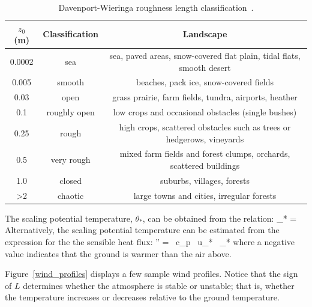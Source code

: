 \documentclass[11pt]{book}
\begin{document}
\begin{table}[!ht]
\centering
\caption[Davenport-Wieringa roughness length classification]{Davenport-Wieringa roughness length classification~\cite{Stull:2000}.}
\begin{tabular}{|c|c|c|} \hline
$z_0$ (m)    & Classification    & Landscape  \\  \hline \hline
0.0002       & sea               & sea, paved areas, snow-covered flat plain, tidal flats, smooth desert \\ \hline
0.005        & smooth            & beaches, pack ice, snow-covered fields                                \\ \hline
0.03         & open              & grass prairie, farm fields, tundra, airports, heather                 \\ \hline
0.1          & roughly open      & low crops and occasional obstacles (single bushes)                    \\ \hline
0.25         & rough             & high crops, scattered obstacles such as trees or hedgerows, vineyards \\ \hline
0.5          & very rough        & mixed farm fields and forest clumps, orchards, scattered buildings    \\ \hline
1.0          & closed            & suburbs, villages, forests                                            \\ \hline
>2           & chaotic           & large towns and cities, irregular forests                             \\ \hline
\end{tabular}
\label{z0}
\end{table}

The scaling potential temperature, $\theta_*$, can be obtained from the relation:
\be
   \theta_* = 
\ee
Alternatively, the scaling potential temperature can be estimated from the expression for the the sensible heat flux:
\be
   '' = \rho \, c_p \, u_* \, \theta_*
\ee
where a negative value indicates that the ground is warmer than the air above.

Figure~\ref{wind_profiles} displays a few sample wind profiles. Notice that the sign of $L$ determines whether the atmosphere is stable or unstable; that is, whether the temperature increases or decreases relative to the ground temperature.
\end{document}
